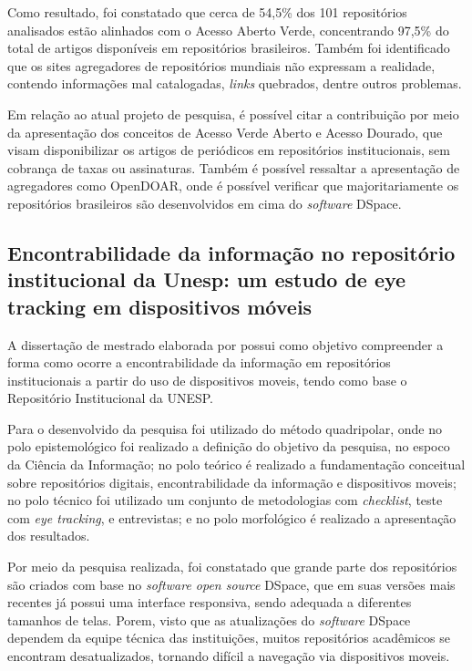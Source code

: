 Como resultado, foi constatado que cerca de 54,5\% dos 101 repositórios
analisados estão alinhados com o Acesso Aberto Verde, concentrando 97,5\%
do total de artigos disponíveis em repositórios brasileiros. Também foi
identificado que os sites agregadores de repositórios mundiais não
expressam a realidade, contendo informações mal catalogadas,
\emph{links} quebrados, dentre outros problemas.

Em relação ao atual projeto de pesquisa, é possível citar a contribuição
por meio da apresentação dos conceitos de Acesso Verde Aberto e Acesso
Dourado, que visam disponibilizar os artigos de periódicos em repositórios
institucionais, sem cobrança de taxas ou assinaturas. Também é possível
ressaltar a apresentação de agregadores como OpenDOAR, onde é possível
verificar que majoritariamente os repositórios brasileiros são
desenvolvidos em cima do \emph{software} DSpace.

\subsection{Encontrabilidade da informação no repositório institucional da Unesp: um estudo de eye tracking em dispositivos móveis}

A dissertação de mestrado elaborada por \cite{2019:FernandesMacedes}
possui como objetivo compreender a forma como ocorre a encontrabilidade
da informação em repositórios institucionais a partir do uso de dispositivos
moveis, tendo como base o Repositório Institucional da UNESP.

Para o desenvolvido da pesquisa foi utilizado do método quadripolar, onde
no polo epistemológico foi realizado a definição do objetivo da pesquisa,
no espoco da Ciência da Informação; no polo teórico é realizado a
fundamentação conceitual sobre repositórios digitais, encontrabilidade
da informação e dispositivos moveis; no polo técnico foi utilizado um
conjunto de metodologias com \emph{checklist}, teste com \emph{eye tracking},
e entrevistas; e no polo morfológico é realizado a apresentação dos resultados.

Por meio da pesquisa realizada, foi constatado que grande parte dos
repositórios são criados com base no \emph{software open source} DSpace,
que em suas versões mais recentes já possui uma interface responsiva,
sendo adequada a diferentes tamanhos de telas. Porem, visto que as
atualizações do \emph{software} DSpace dependem da equipe técnica das instituições,
muitos repositórios acadêmicos se encontram desatualizados, tornando
difícil a navegação via dispositivos moveis.

